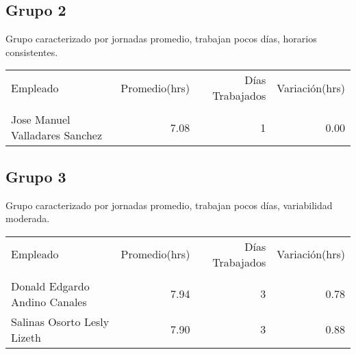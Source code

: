 \documentclass[11pt,a4paper]{article}
\begin{document}
\subsection*{Grupo 2}
Grupo caracterizado por jornadas promedio, trabajan pocos días, horarios consistentes.

\begin{tabular}{lrrr}
\toprule
Empleado & Promedio(hrs) & Días Trabajados & Variación(hrs) \\\\
\midrule
Jose Manuel Valladares Sanchez & 7.08 & 1 & 0.00 \\
\bottomrule
\end{tabular}

\subsection*{Grupo 3}
Grupo caracterizado por jornadas promedio, trabajan pocos días, variabilidad moderada.

\begin{tabular}{lrrr}
\toprule
Empleado & Promedio(hrs) & Días Trabajados & Variación(hrs) \\\\
\midrule
Donald Edgardo Andino Canales & 7.94 & 3 & 0.78 \\
Salinas Osorto Lesly Lizeth & 7.90 & 3 & 0.88 \\
\bottomrule
\end{tabular}
\end{document}
